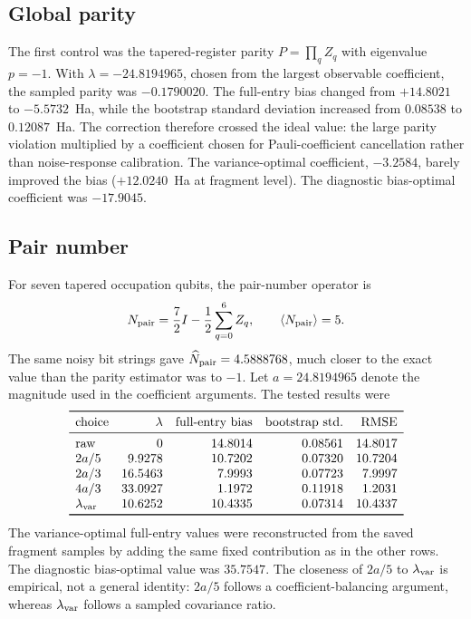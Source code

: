 \documentclass[11pt]{article}
\begin{document}
\subsection{Global parity}

The first control was the tapered-register parity
$P=\prod_q Z_q$ with eigenvalue $p=-1$.  With
$\lambda=-24.8194965$, chosen from the largest observable coefficient, the
sampled parity was $-0.1790020$.  The full-entry bias changed from
$+14.8021$ to $-5.5732$~Ha, while the bootstrap standard deviation increased
from $0.08538$ to $0.12087$~Ha.  The correction therefore crossed the ideal
value: the large parity violation multiplied by a coefficient chosen for
Pauli-coefficient cancellation rather than noise-response calibration.
The variance-optimal coefficient, $-3.2584$, barely improved the bias
($+12.0240$~Ha at fragment level).  The diagnostic bias-optimal coefficient
was $-17.9045$.

\subsection{Pair number}

For seven tapered occupation qubits, the pair-number operator is
\[
  N_{\rm pair}=\frac{7}{2}I-\frac12\sum_{q=0}^{6}Z_q,
  \qquad \langle N_{\rm pair}\rangle=5.
\]
The same noisy bit strings gave $\widehat N_{\rm pair}=4.5888768$, much
closer to the exact value than the parity estimator was to $-1$.  Let
$a=24.8194965$ denote the magnitude used in the coefficient arguments.
The tested results were
\[
\begin{array}{lrrrr}
\toprule
\text{choice} & \lambda & \text{full-entry bias} & \text{bootstrap std.}
              & \text{RMSE}\\
\midrule
\text{raw} & 0 & 14.8014 & 0.08561 & 14.8017\\
2a/5 & 9.9278 & 10.7202 & 0.07320 & 10.7204\\
2a/3 & 16.5463 & 7.9993 & 0.07723 & 7.9997\\
4a/3 & 33.0927 & 1.1972 & 0.11918 & 1.2031\\
\lambda_{\rm var} & 10.6252 & 10.4335 & 0.07314 & 10.4337\\
\bottomrule
\end{array}
\]
The variance-optimal full-entry values were reconstructed from the saved
fragment samples by adding the same fixed contribution as in the other rows.
The diagnostic bias-optimal value was $35.7547$.  The closeness of $2a/5$ to
$\lambda_{\rm var}$ is empirical, not a general identity: $2a/5$ follows a
coefficient-balancing argument, whereas $\lambda_{\rm var}$ follows a sampled
covariance ratio.
\end{document}

